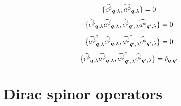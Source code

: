 \documentclass[10pt,a4paper,twoside,openany]{book}
\begin{document}
\begin{equation*}
\{\Faop \pt \q \sp, \aop \pt \q \sp\} = 0
\end{equation*}
\begin{equation*}
\{\Faop \pt \q \sp \aop \pt \q \sp, \Faop \pt {\q'} \sp \aop \pt {\q'} \sp\} = 0
\end{equation*}
\begin{equation*}
\{\cop \pt \q \sp \Faop \pt \q \sp, \cop \pt {\q'} \sp \Faop \pt {\q'} \sp\} = 0
\end{equation*}
\begin{equation*}
\{\Faop \pt \q \sp \aop \pt \q \sp, \cop \pt {\q'} \sp \Faop \pt {\q'} \sp\} = \delta_{\q,\q'}
\end{equation*}

\section{Dirac spinor operators}
\label{Dirac spinors}
\end{document}

